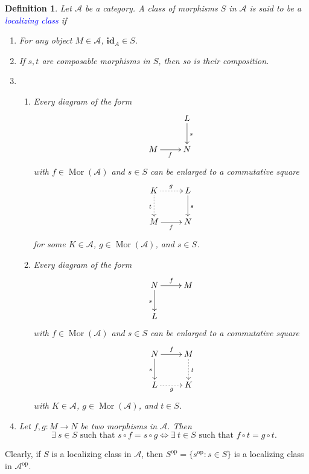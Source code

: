 \documentclass[11pt]{article}
\theoremstyle{thmstyle}
\theoremstyle{defstyle}
\newtheorem{definition}[theorem]{Definition}
\newcommand{\id}{\mathbf{id}}
\newcommand{\scrA}{\mathscr{A}}
\newcommand{\define}[1]{\textcolor{blue}{\textit{#1}}}
\newcommand{\Mor}{\operatorname{Mor}}
\newcommand{\op}{\mathrm{op}}
\begin{document}
\begin{definition}
	Let $\scrA$ be a category. A class of morphisms $S$ in $\scrA$ is said to be a \define{localizing class} if 
	\begin{enumerate}[label=(\textbf{LC}\arabic*)]
		\item For any object $M\in\scrA$, $\id_A\in S$.
		\item If $s, t$ are composable morphisms in $S$, then so is their composition.
		\item 
		\begin{enumerate}
			\item Every diagram of the form 
			\begin{equation*}
				\xymatrix {
					& L\ar[d]^s\\
					M\ar[r]_f & N
				}
			\end{equation*}
			with $f\in\Mor(\scrA)$ and $s\in S$ can be enlarged to a commutative square 
			\begin{equation*}
				\xymatrix {
					K\ar@{.>}[r]^g\ar@{.>}[d]_t & L\ar[d]^s\\
					M\ar[r]_f & N
				}
			\end{equation*}
			for some $K\in\scrA$, $g\in\Mor(\scrA)$, and $s\in S$. \label{pullback-type}
			\item Every diagram of the form 
			\begin{equation*}
				\xymatrix {
					N\ar[r]^f\ar[d]_s & M\\
					L
				}
			\end{equation*}
			with $f\in\Mor(\scrA)$ and $s\in S$ can be enlarged to a commutative square 
			\begin{equation*}
				\xymatrix {
					N\ar[r]^f\ar[d]_s & M\ar@{.>}[d]^t\\
					L\ar@{.>}[r]_g & K
				}
			\end{equation*}
			with $K\in\scrA$, $g\in\Mor(\scrA)$, and $t\in S$.\label{pushout-type}
		\end{enumerate}
		\item Let $f,g\colon M\to N$ be two morphisms in $\scrA$. Then \label{annihilation-condition}
		\begin{equation*}
			\exists~s\in S\text{ such that }s\circ f = s\circ g\iff \exists~t\in S\text{ such that }f\circ t = g\circ t.
		\end{equation*}
	\end{enumerate}
\end{definition}

\begin{center}
Clearly, if $S$ is a localizing class in $\scrA$, then $S^\op = \{s^\op\colon s\in S\}$ is a localizing class in $\scrA^\op$.
\end{center}
\end{document}
